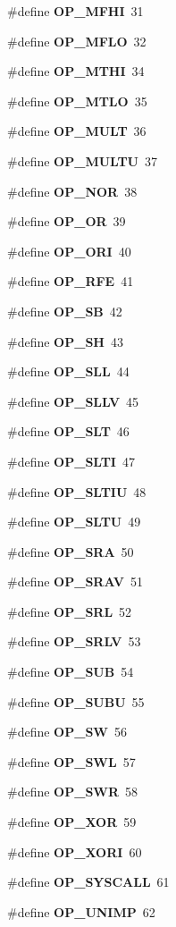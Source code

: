 \begin{DoxyCompactItemize}
\#define {\bf O\+P\+\_\+\+M\+F\+HI}~31
\item 
\#define {\bf O\+P\+\_\+\+M\+F\+LO}~32
\item 
\#define {\bf O\+P\+\_\+\+M\+T\+HI}~34
\item 
\#define {\bf O\+P\+\_\+\+M\+T\+LO}~35
\item 
\#define {\bf O\+P\+\_\+\+M\+U\+LT}~36
\item 
\#define {\bf O\+P\+\_\+\+M\+U\+L\+TU}~37
\item 
\#define {\bf O\+P\+\_\+\+N\+OR}~38
\item 
\#define {\bf O\+P\+\_\+\+OR}~39
\item 
\#define {\bf O\+P\+\_\+\+O\+RI}~40
\item 
\#define {\bf O\+P\+\_\+\+R\+FE}~41
\item 
\#define {\bf O\+P\+\_\+\+SB}~42
\item 
\#define {\bf O\+P\+\_\+\+SH}~43
\item 
\#define {\bf O\+P\+\_\+\+S\+LL}~44
\item 
\#define {\bf O\+P\+\_\+\+S\+L\+LV}~45
\item 
\#define {\bf O\+P\+\_\+\+S\+LT}~46
\item 
\#define {\bf O\+P\+\_\+\+S\+L\+TI}~47
\item 
\#define {\bf O\+P\+\_\+\+S\+L\+T\+IU}~48
\item 
\#define {\bf O\+P\+\_\+\+S\+L\+TU}~49
\item 
\#define {\bf O\+P\+\_\+\+S\+RA}~50
\item 
\#define {\bf O\+P\+\_\+\+S\+R\+AV}~51
\item 
\#define {\bf O\+P\+\_\+\+S\+RL}~52
\item 
\#define {\bf O\+P\+\_\+\+S\+R\+LV}~53
\item 
\#define {\bf O\+P\+\_\+\+S\+UB}~54
\item 
\#define {\bf O\+P\+\_\+\+S\+U\+BU}~55
\item 
\#define {\bf O\+P\+\_\+\+SW}~56
\item 
\#define {\bf O\+P\+\_\+\+S\+WL}~57
\item 
\#define {\bf O\+P\+\_\+\+S\+WR}~58
\item 
\#define {\bf O\+P\+\_\+\+X\+OR}~59
\item 
\#define {\bf O\+P\+\_\+\+X\+O\+RI}~60
\item 
\#define {\bf O\+P\+\_\+\+S\+Y\+S\+C\+A\+LL}~61
\item 
\#define {\bf O\+P\+\_\+\+U\+N\+I\+MP}~62
\item 

\end{DoxyCompactItemize}
